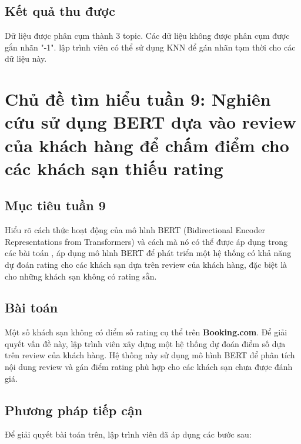 \subsection{Kết quả thu được}
Dữ liệu được phân cụm thành 3 topic. Các dữ liệu không được phân cụm được gắn nhãn "-1". lập trình viên có thể sử dụng KNN để gán nhãn tạm thời cho các dữ liệu này.





\section{Chủ đề tìm hiểu tuần 9: Nghiên cứu sử dụng BERT dựa vào review của khách hàng để chấm điểm cho các khách sạn thiếu rating}

\setcounter{figure}{0} %
\renewcommand{\thefigure}{4.\arabic{figure}}

\subsection{Mục tiêu tuần 9}
  Hiểu rõ cách thức hoạt động của mô hình BERT (Bidirectional Encoder Representations from Transformers) và cách mà nó có thể được áp dụng trong các bài toán , áp dụng mô hình BERT để phát triển một hệ thống có khả năng dự đoán rating cho các khách sạn dựa trên review của khách hàng, đặc biệt là cho những khách sạn không có rating sẵn.


    \subsection{Bài toán}
Một số khách sạn không có điểm số rating cụ thể trên \textbf{Booking.com}. Để giải quyết vấn đề này, lập trình viên xây dựng một hệ thống dự đoán điểm số dựa trên review của khách hàng. Hệ thống này sử dụng mô hình BERT để phân tích nội dung review và gán điểm rating phù hợp cho các khách sạn chưa được đánh giá.

\subsection{Phương pháp tiếp cận}
Để giải quyết bài toán trên, lập trình viên đã áp dụng các bước sau:

